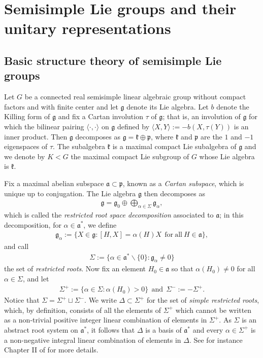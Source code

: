 \documentclass[psamsfonts]{amsart}
\theoremstyle{definition}
\theoremstyle{remark}
\numberwithin{equation}{section}
\begin{document}
\section{Semisimple Lie groups and their unitary representations}
\label{Liegroupsandunitaryreps}
\subsection{Basic structure theory of semisimple Lie groups}
Let $G$ be a connected real semisimple linear algebraic group without compact factors and with finite center and let $\mathfrak{g}$ denote its Lie algebra. Let $b$ denote the Killing form of $\mathfrak{g}$ and fix a Cartan involution $\tau$ of $\mathfrak{g}$; that is, an involution of $\mathfrak{g}$ for which the bilinear pairing $\langle \cdot, \cdot \rangle$ on $\mathfrak{g}$ defined by $\langle X, Y \rangle := -b(X, \tau (Y))$ is an inner product. Then $\mathfrak{g}$ decomposes as $\mathfrak{g} = \mathfrak{k} \oplus \mathfrak{p}$, where $\mathfrak{k}$ and $\mathfrak{p}$ are the $1$ and $-1$ eigenspaces of $\tau$. The subalgebra $\mathfrak{k}$ is a maximal compact Lie subalgebra of $\mathfrak{g}$ and we denote by $K < G$ the maximal compact Lie subgroup of $G$ whose Lie algebra is $\mathfrak{k}$.

Fix a maximal abelian subspace $\mathfrak{a} \subset \mathfrak{p}$, known as a \emph{Cartan subspace}, which is unique up to conjugation. The Lie algebra $\mathfrak{g}$ then decomposes as 
\begin{align*}
    \mathfrak{g} = \mathfrak{g}_{0} \oplus \bigoplus_{\alpha \in \Sigma} \mathfrak{g}_{\alpha},
\end{align*} which is called the \emph{restricted root space decomposition} associated to $\mathfrak{a}$; in this decomposition, for $\alpha \in \mathfrak{a}^{*}$, we define
\begin{align*}
    \mathfrak{g}_{\alpha} := \{X \in \mathfrak{g} : [H,X] = \alpha (H)X \ \ \mathrm{for \ all} \ H \in \mathfrak{a} \},
\end{align*} and call
\begin{align*}
    \Sigma := \{ \alpha \in \mathfrak{a}^{*} \smallsetminus \{0\} : \mathfrak{g}_{\alpha} \neq 0 \}
\end{align*} the set of \emph{restricted roots}. Now fix an element $H_{0} \in \mathfrak{a}$ so that $\alpha (H_{0}) \neq 0$ for all $\alpha \in \Sigma$, and let
\begin{align*}
\Sigma^{+} := \{ \alpha \in \Sigma : \alpha (H_{0}) > 0 \} \ \ \mathrm{and} \ \ \Sigma^{-} := - \Sigma^{+}.
\end{align*} Notice that $\Sigma = \Sigma^{+} \sqcup \Sigma^{-}$. We write $\Delta \subset \Sigma^{+}$ for the set of \emph{simple restricted roots}, which, by definition, consists of all the elements of $\Sigma^{+}$ which cannot be written as a non-trivial positive integer linear combination of elements in $\Sigma^{+}$. As $\Sigma$ is an abstract root system on $\mathfrak{a}^{*}$, it follows that $\Delta$ is a basis of $\mathfrak{a}^{*}$ and every $\alpha \in \Sigma^{+}$ is a non-negative integral linear combination of elements in $\Delta$. See for instance Chapter II of \cite{Kn1} for more details.
\end{document}
